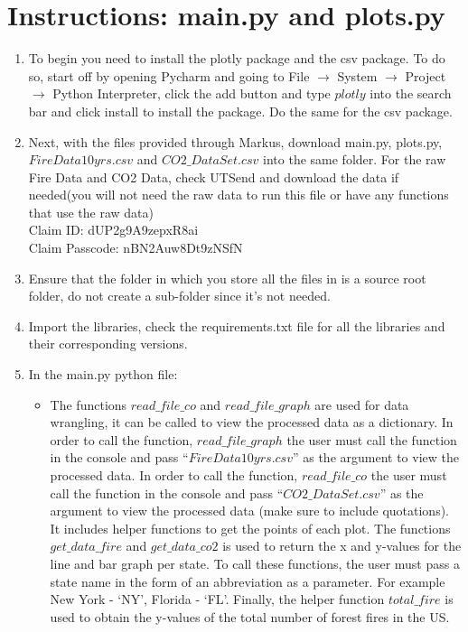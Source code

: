 \documentclass[fontsize=11pt]{article}
\begin{document}
\pagebreak

\section*{Instructions: main.py and plots.py}
\begin{enumerate}
    \item To begin you need to install the plotly package and the csv package. To do so, start off by opening Pycharm and going to File $\rightarrow$ System $\rightarrow$ Project $\rightarrow$ Python Interpreter, click the add button and type $plotly$ into the search bar and click install to install the package. Do the same for the csv package. 
    \item Next, with the files provided through Markus, download main.py,  plots.py, $FireData10yrs.csv$ and $CO2\_DataSet.csv$ into the same folder. For the raw Fire Data and CO2 Data, check UTSend and download the data if needed(you will not need the raw data to run this file or have any functions that use the raw data) \\
    Claim ID: dUP2g9A9zepxR8ai \\
    Claim Passcode: nBN2Auw8Dt9zNSfN
    \\
    \item Ensure that the folder in which you store all the files in is a source root folder, do not create a sub-folder since it’s not needed.
    \item Import the libraries, check the requirements.txt file for all the libraries and their corresponding versions.
    \item In the main.py python file:
    \begin{itemize}
        \item The functions $read\_file\_co$ and $read\_file\_graph$ are used for data wrangling, it can be called to view the processed data as a dictionary. In order to call the function, $read\_file\_graph$ the user must call the function in the console and pass “$FireData10yrs.csv$” as the argument to view the processed data. In order to call the function, $read\_file\_co$ the user must call the function in the console and pass “$CO2\_DataSet.csv$” as the argument to view the processed data (make sure to include quotations). It includes helper functions to get the points of each plot. The functions $get\_data\_fire$ and $get\_data\_co2$ is used to return the x and y-values for the line and bar graph per state. To call these functions, the user must pass a state name in the form of an abbreviation as a parameter. For example New York - ‘NY’, Florida - ‘FL’. Finally, the helper function $total\_fire$ is used to obtain the y-values of the total number of forest fires in the US. 

\end{itemize}
\end{enumerate}
\end{document}
